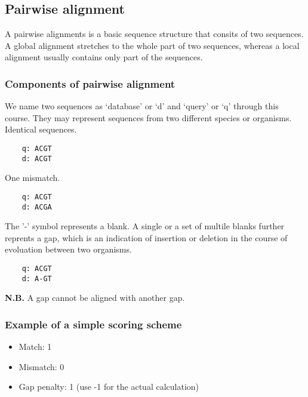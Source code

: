 %
%

%
%
\subsection{Pairwise alignment}
A pairwise alignments is a basic sequence structure that consits of two sequences. A global alignment stretches to the whole part of two sequences, whereas a local alignment usually contains only part of the sequences.

%
%
\subsubsection*{Components of pairwise alignment}

We name two sequences as ‘database’ or ‘d’ and ‘query’ or ‘q’ through this course. They may represent sequences from two different species or organisms.
\\

\noindent
Identical sequences.
\begin{verbatim}
    q: ACGT
    d: ACGT
\end{verbatim}

\noindent
One mismatch.
\begin{verbatim}
    q: ACGT
    d: ACGA
\end{verbatim}

\noindent
The '-' symbol represents a blank. A single or a set of multile blanks further reprents a gap, which is an indication of insertion or deletion in the course of evoluation between two organisms.
\begin{verbatim}
    q: ACGT
    d: A-GT
\end{verbatim}

\noindent
\textbf{N.B.} A gap cannot be aligned with another gap.

%
%
\subsubsection*{Example of a simple scoring scheme}
\begin{itemize}
\item Match: 1
\item Mismatch: 0
\item Gap penalty: 1 (use -1 for the actual calculation)
\end{itemize}

